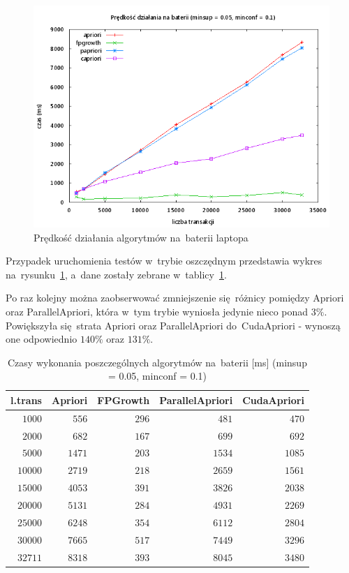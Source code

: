 \begin{figure}[H]
\centering
\includegraphics[width=1.1\textwidth]{figures/06/005_01_bat.png}
\caption{Prędkość działania algorytmów na~baterii laptopa\label{rys:005_01_bat}}
\end{figure}

Przypadek uruchomienia testów w~trybie oszczędnym przedstawia wykres na~rysunku~\ref{rys:005_01_bat}, a~dane zostały zebrane w~tablicy~\ref{tab:005_01_bat}. 

Po raz kolejny można zaobserwować zmniejszenie się~różnicy pomiędzy Apriori oraz ParallelApriori, która w~tym trybie wyniosła jedynie nieco ponad $3\%$. Powiększyła się~strata Apriori oraz ParallelApriori do~CudaApriori - wynoszą one odpowiednio $140\%$ oraz $131\%$. 

\begin{table}
	\centering
	\begin{tabular}{r|r|r|r|r}
	\textbf{l.trans} & \textbf{Apriori} & \textbf{FPGrowth} & \textbf{ParallelApriori} & \textbf{CudaApriori}  \\ \hline
	$1000$ & $556$ & $296$ & $481$ & $470$ \\
	$2000$ & $682$ & $167$ & $699$ & $692$ \\
	$5000$ & $1471$ & $203$ & $1534$ & $1085$ \\
	$10000$ & $2719$ & $218$ & $2659$ & $1561$ \\
	$15000$ & $4053$ & $391$ & $3826$ & $2038$ \\
	$20000$ & $5131$ & $284$ & $4931$ & $2269$ \\
	$25000$ & $6248$ & $354$ & $6112$ & $2804$ \\
	$30000$ & $7665$ & $517$ & $7449$ & $3296$ \\
	$32711$ & $8318$ & $393$ & $8045$ & $3480$ \\
	\end{tabular}
	\caption{Czasy wykonania poszczególnych algorytmów na~baterii [ms] (minsup = 0.05, minconf = 0.1)\label{tab:005_01_bat}}
\end{table}


